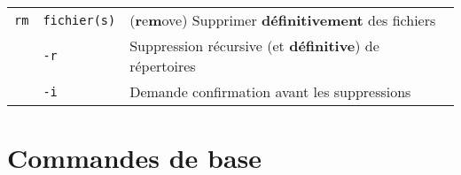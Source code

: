 \documentclass [a4paper]{article}
\begin{document}
\begin{tabular}{ lll }
{\verb+rm+}     & \verb+fichier(s)+            & (\textbf{r}e\textbf{m}ove) Supprimer \textbf{définitivement} des fichiers \\
                & \hspace{-0.6cm}\verb+-r+                      & \hspace{0.4cm} Suppression récursive (et \textbf{définitive}) de répertoires\\
                & \hspace{-0.6cm}\verb+-i+                      & \hspace{0.4cm} Demande confirmation avant les suppressions \\
\hline
\end{tabular}

\section*{Commandes de base}
\end{document}
